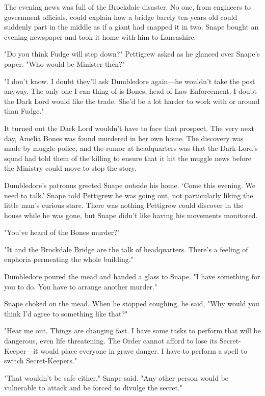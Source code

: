 The evening news was full of the Brockdale disaster. No one, from engineers to government officials, could explain how a bridge barely ten years old could suddenly part in the middle as if a giant had snapped it in two. Snape bought an evening newspaper and took it home with him to Lancashire.

"Do you think Fudge will step down?" Pettigrew asked as he glanced over Snape's paper. "Who would be Minister then?"

"I don't know. I doubt they'll ask Dumbledore again—he wouldn't take the post anyway. The only one I can thing of is Bones, head of Law Enforcement. I doubt the Dark Lord would like the trade. She'd be a lot harder to work with or around than Fudge."

It turned out the Dark Lord wouldn't have to face that prospect. The very next day, Amelia Bones was found murdered in her own home. The discovery was made by muggle police, and the rumor at headquarters was that the Dark Lord's squad had told them of the killing to ensure that it hit the muggle news before the Ministry could move to stop the story.

Dumbledore's patronus greeted Snape outside his home. `Come this evening. We need to talk.' Snape told Pettigrew he was going out, not particularly liking the little man's curious stare. There was nothing Pettigrew could discover in the house while he was gone, but Snape didn't like having his movements monitored.

\sbreak

"You've heard of the Bones murder?"

"It and the Brockdale Bridge are the talk of headquarters. There's a feeling of euphoria permeating the whole building."

Dumbledore poured the mead and handed a glass to Snape. "I have something for you to do. You have to arrange another murder."

Snape choked on the mead. When he stopped coughing, he said, "Why would you think I'd agree to something like that?"

"Hear me out. Things are changing fast. I have some tasks to perform that will be dangerous, even life threatening. The Order cannot afford to lose its Secret-Keeper—it would place everyone in grave danger. I have to perform a spell to switch Secret-Keepers."

"That wouldn't be safe either," Snape said. "Any other person would be vulnerable to attack and be forced to divulge the secret."

